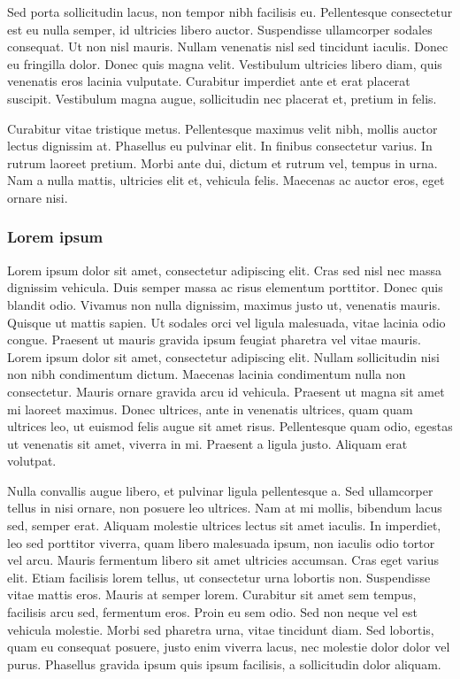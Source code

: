 \documentclass{article}
\begin{document}
 Sed porta sollicitudin lacus, non tempor nibh facilisis eu. Pellentesque consectetur est eu nulla semper, id ultricies libero auctor. Suspendisse ullamcorper sodales consequat. Ut non nisl mauris. Nullam venenatis nisl sed tincidunt iaculis. Donec eu fringilla dolor. Donec quis magna velit. Vestibulum ultricies libero diam, quis venenatis eros lacinia vulputate. Curabitur imperdiet ante et erat placerat suscipit. Vestibulum magna augue, sollicitudin nec placerat et, pretium in felis. 



 Curabitur vitae tristique metus. Pellentesque maximus velit nibh, mollis auctor lectus dignissim at. Phasellus eu pulvinar elit. In finibus consectetur varius. In rutrum laoreet pretium. Morbi ante dui, dictum et rutrum vel, tempus in urna. Nam a nulla mattis, ultricies elit et, vehicula felis. Maecenas ac auctor eros, eget ornare nisi. 

\subsubsection{ Lorem ipsum}

 Lorem ipsum dolor sit amet, consectetur adipiscing elit. Cras sed nisl nec massa dignissim vehicula. Duis semper massa ac risus elementum porttitor. Donec quis blandit odio. Vivamus non nulla dignissim, maximus justo ut, venenatis mauris. Quisque ut mattis sapien. Ut sodales orci vel ligula malesuada, vitae lacinia odio congue. Praesent ut mauris gravida ipsum feugiat pharetra vel vitae mauris. Lorem ipsum dolor sit amet, consectetur adipiscing elit. Nullam sollicitudin nisi non nibh condimentum dictum. Maecenas lacinia condimentum nulla non consectetur. Mauris ornare gravida arcu id vehicula. Praesent ut magna sit amet mi laoreet maximus. Donec ultrices, ante in venenatis ultrices, quam quam ultrices leo, ut euismod felis augue sit amet risus. Pellentesque quam odio, egestas ut venenatis sit amet, viverra in mi. Praesent a ligula justo. Aliquam erat volutpat. 



 Nulla convallis augue libero, et pulvinar ligula pellentesque a. Sed ullamcorper tellus in nisi ornare, non posuere leo ultrices. Nam at mi mollis, bibendum lacus sed, semper erat. Aliquam molestie ultrices lectus sit amet iaculis. In imperdiet, leo sed porttitor viverra, quam libero malesuada ipsum, non iaculis odio tortor vel arcu. Mauris fermentum libero sit amet ultricies accumsan. Cras eget varius elit. Etiam facilisis lorem tellus, ut consectetur urna lobortis non. Suspendisse vitae mattis eros. Mauris at semper lorem. Curabitur sit amet sem tempus, facilisis arcu sed, fermentum eros. Proin eu sem odio. Sed non neque vel est vehicula molestie. Morbi sed pharetra urna, vitae tincidunt diam. Sed lobortis, quam eu consequat posuere, justo enim viverra lacus, nec molestie dolor dolor vel purus. Phasellus gravida ipsum quis ipsum facilisis, a sollicitudin dolor aliquam. 
\end{document}
